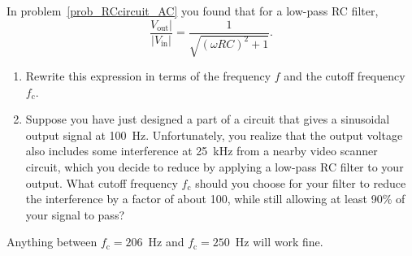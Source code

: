 \newpage

\begin{Exercise}
In problem~\ref{prob_RCcircuit_AC} you found that for a low-pass RC filter,
$$\frac{V_\text{out} |}{|V_\text{in} |} = \frac{1}{\sqrt{(\omega RC)^2+1}}.$$
\begin{enumerate}[label=(\alph*),nosep]
\item Rewrite this expression in terms of the frequency $f$ and the cutoff frequency $f_\text{c}$. 

\item Suppose you have just designed a part of a circuit that gives a sinusoidal output signal at 100~Hz.  Unfortunately, you realize that the output voltage also includes some interference at 25~kHz from a nearby video scanner circuit, which you decide to reduce by applying a low-pass RC filter to your output.  What cutoff frequency $f_\text{c}$ should you choose for your filter to reduce the interference by a factor of about 100, while still allowing at least 90\% of your signal to pass?  
\end{enumerate}
\end{Exercise}
\begin{Answer}
Anything between $f_\text{c}=206$~Hz and $f_\text{c}=250$~Hz will work fine.
\end{Answer}


